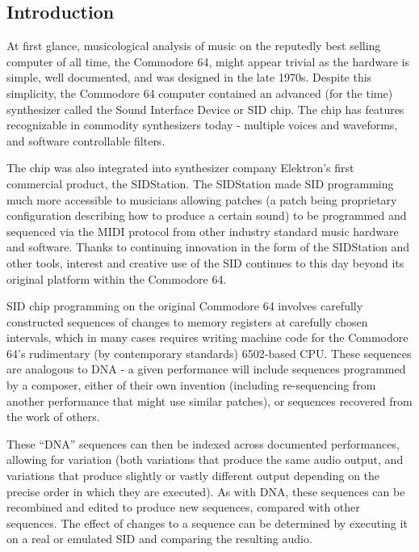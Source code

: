 \documentclass[10pt]{article}
\begin{document}
\begin{multicols*}{2}

  \section{Introduction}

  At first glance, musicological analysis of music on the reputedly best selling computer of all time, the Commodore 64\cite{ieeec64}, might appear trivial as the hardware is simple, well documented, and was designed in the late 1970s. Despite this simplicity, the Commodore 64 computer contained an advanced (for the time) synthesizer called the Sound Interface Device\cite{sidpatent} or SID chip. The chip has features recognizable in commodity synthesizers today - multiple voices and waveforms, and software controllable filters.

  The chip was also integrated into synthesizer company Elektron’s first commercial product, the SIDStation\cite{sidstation}.  The SIDStation made SID programming much more accessible to musicians allowing patches (a patch being proprietary configuration describing how to produce a certain sound) to be programmed and sequenced via the MIDI protocol from other industry standard music hardware and software. Thanks to continuing innovation in the form of the SIDStation and other tools, interest and creative use of the SID continues to this day beyond its original platform within the Commodore 64.

SID chip programming on the original Commodore 64 involves carefully constructed sequences of changes to memory registers at carefully chosen intervals, which in many cases requires writing machine code for the Commodore 64's rudimentary (by contemporary standards) 6502-based CPU. These sequences are analogous to DNA - a given performance will include sequences programmed by a composer, either of their own invention (including re-sequencing from another performance that might use similar patches), or sequences recovered from the work of others.

These “DNA” sequences can then be indexed across documented performances, allowing for variation (both variations that produce the same audio output, and variations that produce slightly or vastly different output depending on the precise order in which they are executed). As with DNA, these sequences can be recombined and edited to produce new sequences, compared with other sequences. The effect of changes to a sequence can be determined by executing it on a real or emulated SID and comparing the resulting audio.


\end{multicols*}
\end{document}
